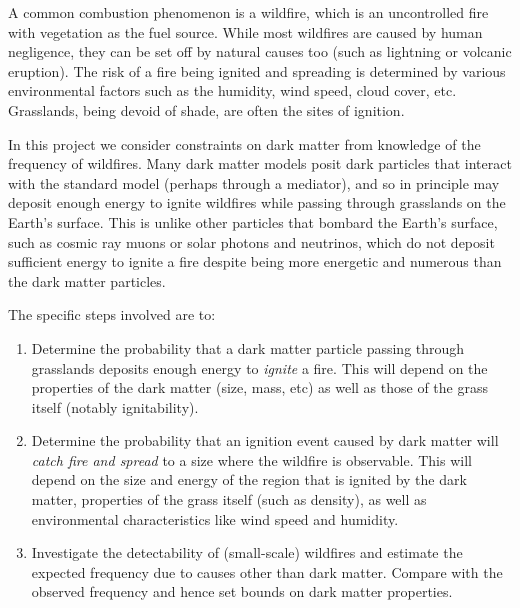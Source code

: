 \documentclass[%
 reprint,
 amsmath,amssymb,
 aps,nofootinbib
]{revtex4-1}
\begin{document}
A common combustion phenomenon is a wildfire, which is an uncontrolled fire with vegetation as the fuel source. While most wildfires are caused by human negligence, they can be set off by natural causes too (such as lightning or volcanic eruption). The risk of a fire being ignited and spreading is determined by various environmental factors such as the humidity, wind speed, cloud cover, etc. Grasslands, being devoid of shade, are often the sites of ignition. 

In this project we consider constraints on dark matter from knowledge of the frequency of wildfires. Many dark matter models posit dark particles that interact with the standard model (perhaps through a mediator), and so in principle may deposit enough energy to ignite wildfires while passing through grasslands on the Earth's surface. This is unlike other particles that bombard the Earth's surface, such as cosmic ray muons or solar photons and neutrinos, which do not deposit sufficient energy to ignite a fire despite being more energetic and numerous than the dark matter particles.

The specific steps involved are to: \begin{enumerate}
    \item Determine the probability that a dark matter particle passing through grasslands deposits enough energy to \emph{ignite} a fire. This will depend on the properties of the dark matter (size, mass, etc) as well as those of the grass itself (notably ignitability).
    \item Determine the probability that an ignition event caused by dark matter will \emph{catch fire and spread} to a size where the wildfire is observable. This will depend on the size and energy of the region that is ignited by the dark matter, properties of the grass itself (such as density), as well as environmental characteristics like wind speed and humidity.
    \item Investigate the detectability of (small-scale) wildfires and estimate the expected frequency due to causes other than dark matter. Compare with the observed frequency and hence set bounds on dark matter properties.
\end{enumerate}





\newpage


% 
\end{document}
